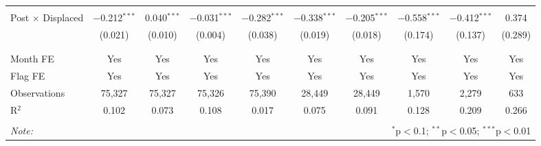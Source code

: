 \documentclass[12pt]{article}
\begin{document}
\begin{landscape}
\begin{table}[H]
\begin{tabular}{@{\extracolsep{1pt}}lccccccccc}
  & & & & & & & & & \\ 
 Post $\times$ Displaced & $-$0.212$^{***}$ & 0.040$^{***}$ & $-$0.031$^{***}$ & $-$0.282$^{***}$ & $-$0.338$^{***}$ & $-$0.205$^{***}$ & $-$0.558$^{***}$ & $-$0.412$^{***}$ & 0.374 \\ 
  & (0.021) & (0.010) & (0.004) & (0.038) & (0.019) & (0.018) & (0.174) & (0.137) & (0.289) \\ 
  & & & & & & & & & \\ 
\hline \\[-1.8ex] 
Month FE & Yes & Yes & Yes & Yes & Yes & Yes & Yes & Yes & Yes \\ 
Flag FE & Yes & Yes & Yes & Yes & Yes & Yes & Yes & Yes & Yes \\ 
Observations & 75,327 & 75,327 & 75,326 & 75,390 & 28,449 & 28,449 & 1,570 & 2,279 & 633 \\ 
R$^{2}$ & 0.102 & 0.073 & 0.108 & 0.017 & 0.075 & 0.091 & 0.128 & 0.209 & 0.266 \\ 
\hline 
\hline \\[-1.8ex] 
\textit{Note:}  & \multicolumn{9}{r}{$^{*}$p$<$0.1; $^{**}$p$<$0.05; $^{***}$p$<$0.01} \\ 
\end{tabular} 
\end{table} 
\end{landscape}
\end{document}
